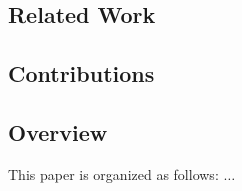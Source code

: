 \subsection{Related Work}
\cite{what-you-c}
\subsection{Contributions}
\subsection{Overview}
This paper is organized as follows: $\ldots$